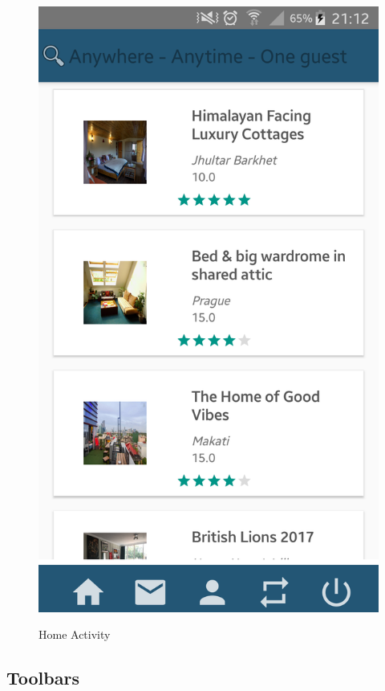 \documentclass[12pt]{article}
\begin{document}
	\begin{figure} [H]
		\begin{center}
			\includegraphics [scale = 0.15] {05-homeActivity.png}\\[1.0 cm]
			\caption{Home Activity}
		\end{center}
	\end{figure}
	
	\subsection{Toolbars}
	
\end{document}
